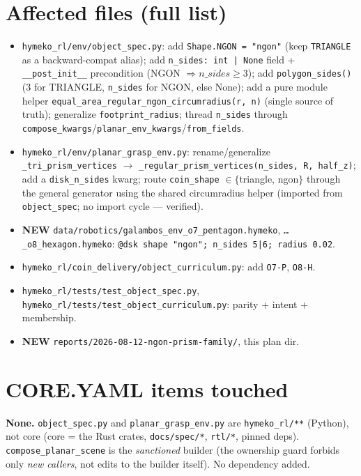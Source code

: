 \documentclass[11pt]{article}
\begin{document}
\section{Affected files (full list)}
\begin{itemize}[nosep]
  \item \texttt{hymeko\_rl/env/object\_spec.py}: add \texttt{Shape.NGON = "ngon"} (keep
    \texttt{TRIANGLE} as a backward-compat alias); add \texttt{n\_sides: int | None} field +
    \texttt{\_\_post\_init\_\_} precondition (NGON $\Rightarrow n\_sides\ge 3$); add
    \texttt{polygon\_sides()} (3 for TRIANGLE, \texttt{n\_sides} for NGON, else None); add a pure
    module helper \texttt{equal\_area\_regular\_ngon\_circumradius(r, n)} (single source of truth);
    generalize \texttt{footprint\_radius}; thread \texttt{n\_sides} through
    \texttt{compose\_kwargs}/\texttt{planar\_env\_kwargs}/\texttt{from\_fields}.
  \item \texttt{hymeko\_rl/env/planar\_grasp\_env.py}: rename/generalize
    \texttt{\_tri\_prism\_vertices} $\to$ \texttt{\_regular\_prism\_vertices(n\_sides, R, half\_z)};
    add a \texttt{disk\_n\_sides} kwarg; route \texttt{coin\_shape} $\in\{$triangle, ngon$\}$ through
    the general generator using the shared circumradius helper (imported from \texttt{object\_spec};
    no import cycle --- verified).
  \item \textbf{NEW} \texttt{data/robotics/galambos\_env\_o7\_pentagon.hymeko},
    \texttt{\ldots\_o8\_hexagon.hymeko}: \texttt{@dsk shape "ngon"; n\_sides 5|6; radius 0.02}.
  \item \texttt{hymeko\_rl/coin\_delivery/object\_curriculum.py}: add \texttt{O7-P}, \texttt{O8-H}.
  \item \texttt{hymeko\_rl/tests/test\_object\_spec.py},
    \texttt{hymeko\_rl/tests/test\_object\_curriculum.py}: parity + intent + membership.
  \item \textbf{NEW} \texttt{reports/2026-08-12-ngon-prism-family/}, this plan dir.
\end{itemize}

\section{CORE.YAML items touched}
\textbf{None.} \texttt{object\_spec.py} and \texttt{planar\_grasp\_env.py} are \texttt{hymeko\_rl/**}
(Python), not core (core = the Rust crates, \texttt{docs/spec/*}, \texttt{rtl/*}, pinned deps).
\texttt{compose\_planar\_scene} is the \emph{sanctioned} builder (the ownership guard forbids only
\emph{new callers}, not edits to the builder itself). No dependency added.
\end{document}
